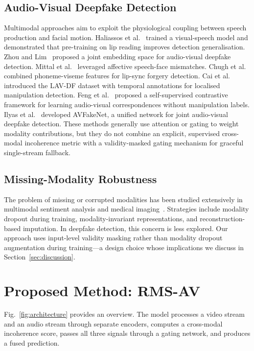 \documentclass[conference]{IEEEtran}
\begin{document}
\subsection{Audio-Visual Deepfake Detection}
Multimodal approaches aim to exploit the physiological coupling between speech production and facial motion. Haliassos et al.~\cite{haliassos2021lips} trained a visual-speech model and demonstrated that pre-training on lip reading improves detection generalisation. Zhou and Lim~\cite{zhou2021joint} proposed a joint embedding space for audio-visual deepfake detection. Mittal et al.~\cite{mittal2020emotions} leveraged affective speech-face mismatches. Chugh et al.~\cite{chugh2020not} combined phoneme-viseme features for lip-sync forgery detection. Cai et al.~\cite{cai2022lavdf} introduced the LAV-DF dataset with temporal annotations for localised manipulation detection. Feng et al.~\cite{feng2023selfsuper} proposed a self-supervised contrastive framework for learning audio-visual correspondences without manipulation labels. Ilyas et al.~\cite{ilyas2023avfakenet} developed AVFakeNet, a unified network for joint audio-visual deepfake detection. These methods generally use attention or gating to weight modality contributions, but they do not combine an explicit, supervised cross-modal incoherence metric with a validity-masked gating mechanism for graceful single-stream fallback.

\subsection{Missing-Modality Robustness}
The problem of missing or corrupted modalities has been studied extensively in multimodal sentiment analysis and medical imaging~\cite{ma2022multimodal}. Strategies include modality dropout during training, modality-invariant representations, and reconstruction-based imputation. In deepfake detection, this concern is less explored. Our approach uses input-level validity masking rather than modality dropout augmentation during training---a design choice whose implications we discuss in Section~\ref{sec:discussion}.

\section{Proposed Method: RMS-AV}

Fig.~\ref{fig:architecture} provides an overview. The model processes a video stream and an audio stream through separate encoders, computes a cross-modal incoherence score, passes all three signals through a gating network, and produces a fused prediction.
\end{document}
